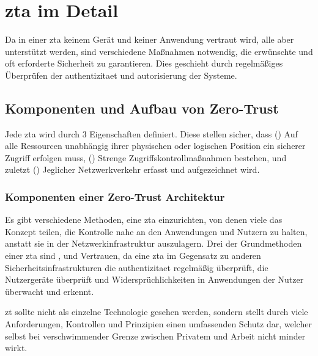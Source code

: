 \newpage
\section[Zero-Trust Architektur im Detail]{\gls{zta} im Detail}\label{sec:zta-im-detail}
Da in einer \gls{zta} keinem Gerät und keiner Anwendung vertraut wird, alle aber unterstützt werden, sind verschiedene Maßnahmen notwendig, die erwünschte und oft erforderte Sicherheit zu garantieren.
Dies geschieht durch regelmäßiges Überprüfen der \gls{authentizitaet} und \gls{autorisierung} der Systeme.\autocite[\vglf][]{dsilvia-2021}

\subsection{Komponenten und Aufbau von Zero-Trust}\label{subsec:komponenten-und-aufbau-von-zero-trust}
Jede \gls{zta} wird durch 3 Eigenschaften definiert.
Diese stellen sicher, dass () Auf alle Ressourcen unabhängig ihrer physischen oder logischen Position ein sicherer Zugriff erfolgen muss, () Strenge Zugriffskontrollmaßnahmen bestehen, und zuletzt () Jeglicher Netzwerkverkehr erfasst und aufgezeichnet wird.\autocite[\vglf][]{dsilvia-2021}

\subsubsection{Komponenten einer Zero-Trust Architektur}
Es gibt verschiedene Methoden, eine \gls{zta} einzurichten, von denen viele das Konzept teilen, die Kontrolle nahe an den Anwendungen und Nutzern zu halten, anstatt sie in der Netzwerkinfrastruktur auszulagern.\autocite[\vglf][]{buck-2021}
Drei der Grundmethoden einer \gls{zta} sind ,  und Vertrauen, da eine \gls{zta} im Gegensatz zu anderen Sicherheitsinfrastrukturen die \gls{authentizitaet} regelmäßig überprüft, die Nutzergeräte überprüft und Widersprüchlichkeiten in Anwendungen der Nutzer überwacht und erkennt.\autocite[\vglf][]{dsilvia-2021}

\gls{zt} sollte nicht als einzelne Technologie gesehen werden, sondern stellt durch viele Anforderungen, Kontrollen und Prinzipien einen umfassenden Schutz dar, welcher selbst bei verschwimmender Grenze zwischen Privatem und Arbeit nicht minder wirkt.\autocite[\vglf][Was sind die Komponenten von Zero Trust]{akamai:online}

